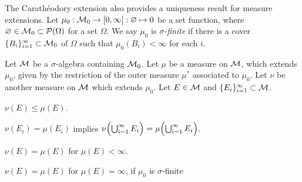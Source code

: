\documentclass{../../large}
\begin{document}
\begin{prb}
The Carath\'eodory extension also provides a uniqueness result for measure extensions.
Let $\mu_0:\mathcal{M}_0\to[0,\infty]:\varnothing\mapsto0$ be a set function, where $\varnothing\in\mathcal{M}_0\subset\mathcal{P}(\Omega)$ for a set $\Omega$.
We say $\mu_0$ is \emph{$\sigma$-finite} if there is a cover $\{B_i\}_{i=1}^\infty\subset\mathcal{M}_0$ of $\Omega$ such that $\mu_0(B_i)<\infty$ for each $i$.

Let $\mathcal{M}$ be a $\sigma$-algebra containing $\mathcal{M}_0$.
Let $\mu$ be a measure on $\mathcal{M}$, which extends $\mu_0$, given by the restriction of the outer measure $\mu^*$ associated to $\mu_0$.
Let $\nu$ be another measure on $\mathcal{M}$ which extends $\mu_0$.
Let $E\in\mathcal{M}$ and $\{E_i\}_{i=1}^\infty\subset\mathcal{M}$.
\begin{parts}
\item $\nu(E)\le\mu(E)$.
\item $\nu(E_i)=\mu(E_i)$ implies $\nu\Bigl(\bigcup_{i=1}^\infty E_i\Bigr)=\mu\Bigl(\bigcup_{i=1}^\infty E_i\Bigr)$.
\item $\nu(E)=\mu(E)$ for $\mu(E)<\infty$.
\item $\nu(E)=\mu(E)$ for $\mu(E)=\infty$, if $\mu_0$ is $\sigma$-finite
\end{parts}
\end{prb}
\end{document}
